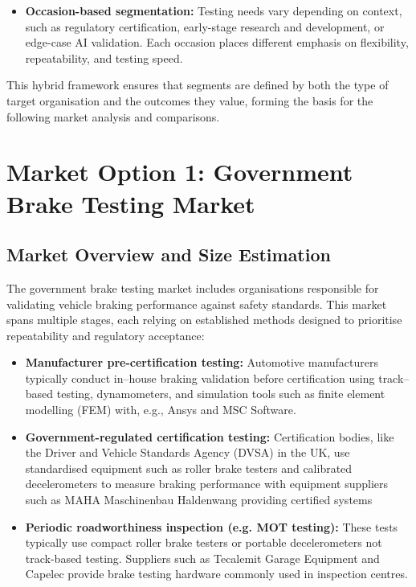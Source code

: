 \documentclass[11pt, a4paper]{report}
\numberwithin{equation}{section}
\begin{document}
\begin{refsection}
\begin{itemize}
    \item \textbf{Occasion-based segmentation:} Testing needs vary depending on context, such as regulatory certification, early-stage research and development, or edge-case AI validation. Each occasion places different emphasis on flexibility, repeatability, and testing speed.
\end{itemize}

This hybrid framework ensures that segments are defined by both the type of target organisation and the outcomes they value, forming the basis for the following market analysis and comparisons.

\section{Market Option 1: Government Brake Testing Market}

\subsection{Market Overview and Size Estimation} 

The government brake testing market includes organisations responsible for validating vehicle braking performance against safety standards. This market spans multiple stages, each relying on established methods designed to prioritise repeatability and regulatory acceptance:

\begin{itemize}
    \item \textbf{Manufacturer pre-certification testing:} Automotive manufacturers typically conduct in--house braking validation before certification using track--based testing, dynamometers, and simulation tools such as finite element modelling (FEM) with, e.g., Ansys and MSC Software.
    
    \item \textbf{Government-regulated certification testing:} Certification bodies, like the Driver and Vehicle Standards Agency (DVSA) in the UK, use standardised equipment such as roller brake testers and calibrated decelerometers to measure braking performance with equipment suppliers such as MAHA Maschinenbau Haldenwang providing certified systems
    
    \item \textbf{Periodic roadworthiness inspection (e.g. MOT testing):} These tests typically use compact roller brake testers or portable decelerometers not track-based testing. Suppliers such as Tecalemit Garage Equipment and Capelec provide brake testing hardware commonly used in inspection centres. 
\end{itemize}


\end{refsection}
\end{document}

